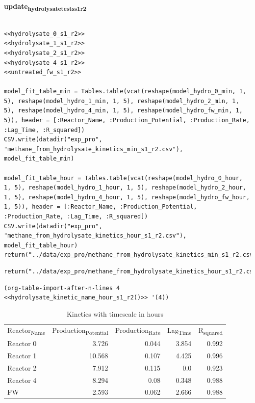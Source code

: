 \documentclass[11pt]{article}
\begin{document}
\textbf{update\textsubscript{hydrolysate}\textsubscript{tests}\textsubscript{s1}\textsubscript{r2}}
\begin{verbatim}

<<hydrolysate_0_s1_r2>>
<<hydrolysate_1_s1_r2>>
<<hydrolysate_2_s1_r2>>
<<hydrolysate_4_s1_r2>>
<<untreated_fw_s1_r2>>

model_fit_table_min = Tables.table(vcat(reshape(model_hydro_0_min, 1, 5), reshape(model_hydro_1_min, 1, 5), reshape(model_hydro_2_min, 1, 5), reshape(model_hydro_4_min, 1, 5), reshape(model_hydro_fw_min, 1, 5)), header = [:Reactor_Name, :Production_Potential, :Production_Rate, :Lag_Time, :R_squared])
CSV.write(datadir("exp_pro", "methane_from_hydrolysate_kinetics_min_s1_r2.csv"), model_fit_table_min)

model_fit_table_hour = Tables.table(vcat(reshape(model_hydro_0_hour, 1, 5), reshape(model_hydro_1_hour, 1, 5), reshape(model_hydro_2_hour, 1, 5), reshape(model_hydro_4_hour, 1, 5), reshape(model_hydro_fw_hour, 1, 5)), header = [:Reactor_Name, :Production_Potential, :Production_Rate, :Lag_Time, :R_squared])
CSV.write(datadir("exp_pro", "methane_from_hydrolysate_kinetics_hour_s1_r2.csv"), model_fit_table_hour)
return("../data/exp_pro/methane_from_hydrolysate_kinetics_min_s1_r2.csv")
\end{verbatim}

\begin{verbatim}
return("../data/exp_pro/methane_from_hydrolysate_kinetics_hour_s1_r2.csv")
\end{verbatim}

\begin{verbatim}
(org-table-import-after-n-lines 4 <<hydrolysate_kinetic_name_hour_s1_r2()>> '(4))
\end{verbatim}

\begin{table}[htbp]
\caption{Kinetics with timescale in hours}
\centering
\begin{tabular}{lrrrr}
Reactor\textsubscript{Name} & Production\textsubscript{Potential} & Production\textsubscript{Rate} & Lag\textsubscript{Time} & R\textsubscript{squared}\\[0pt]
Reactor 0 & 3.726 & 0.044 & 3.854 & 0.992\\[0pt]
Reactor 1 & 10.568 & 0.107 & 4.425 & 0.996\\[0pt]
Reactor 2 & 7.912 & 0.115 & 0.0 & 0.923\\[0pt]
Reactor 4 & 8.294 & 0.08 & 0.348 & 0.988\\[0pt]
FW & 2.593 & 0.062 & 2.666 & 0.988\\[0pt]
\end{tabular}
\end{table}
\end{document}

